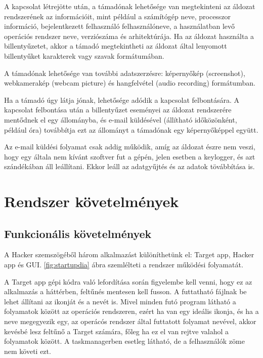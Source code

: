 \documentclass[12pt,a4paper,oneside]{report}
\begin{document}
A kapcsolat létrejötte után, a támadónak lehetősége van megtekinteni az áldozat rendszerének az információit, mint például a számítógép neve, processzor információ, bejelentkezett felhasználó felhasználóneve, a használatban levő operációs rendszer neve, verziószáma és arhitektúrája. Ha az áldozat használta a billentyűzetet, akkor a támadó megtekintheti az áldozat által lenyomott billentyűket karakterek vagy szavak formátumában.

A támadónak lehetősége van további adatszerzésre: képernyőkép (screenshot), webkamerakép (webcam picture) és hangfelvétel (audio recording) formátumban.

Ha a támadó úgy látja jónak, lehetősége adódik a kapcsolat felbontására. A kapcsolat felbontása után a billentyűzet eseményei az áldozat rendszerére mentődnek el egy állományba, és e-mail küldésével (állítható időközönként, például óra) továbbítja ezt az állományt a támadónak egy képernyőképpel együtt.

Az e-mail küldési folyamat csak addig működik, amíg az áldozat észre nem veszi, hogy egy általa nem kívánt szoftver fut a gépén, jelen esetben a keylogger, és azt szándékában áll leállítani. Ekkor leáll az adatgyűjtés és az adatok tövábbítása is.

\section{Rendszer követelmények}

\subsection{Funkcionális követelmények} %
A Hacker szemszögéből három alkalmazást különíthetünk el: Target app, Hacker app és GUI. \ref{fig:startupdia} ábra szemlélteti a rendszer működési folyamatát.

A Target app gépi kódra való lefordítása során figyelembe kell venni, hogy ez az alkalmazás a háttérben, feltűnés mentesen kell fusson. A futtatható fájlnak be lehet állítani az ikonját és a nevét is. Mivel minden futó program látható a folyamatok között az operációs rendszeren, ezért ha van egy ideális ikonja, és ha a neve megegyezik egy, az operácós rendszer által futtatott folyamat nevével, akkor kevésbé lesz feltűnő a Target számára, főleg ha ez el van rejtve valahol a folyamatok között. A taskmanagerben esetleg látható, de a felhasználók zöme nem követi ezt.
\end{document}
